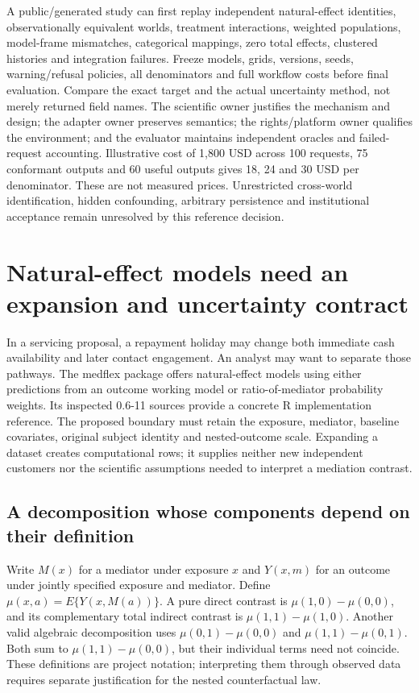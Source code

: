 A public/generated study can first replay independent natural-effect
identities, observationally equivalent worlds, treatment interactions,
weighted populations, model-frame mismatches, categorical mappings, zero total
effects, clustered histories and integration failures. Freeze models, grids,
versions, seeds, warning/refusal policies, all denominators and full workflow
costs before final evaluation. Compare the exact target and the actual
uncertainty method, not merely returned field names. The scientific owner
justifies the mechanism and design; the adapter owner preserves semantics;
the rights/platform owner qualifies the environment; and the evaluator
maintains independent oracles and failed-request accounting. Illustrative
cost of 1,800 USD across 100 requests, 75 conformant outputs and 60 useful
outputs gives 18, 24 and 30 USD per denominator. These are not measured prices.
Unrestricted cross-world identification, hidden confounding, arbitrary
persistence and institutional acceptance remain unresolved by this reference
decision.~\citep{exec24_mediation_contract}


\section{Natural-effect models need an expansion and uncertainty contract}
\label{exec23:medflex-scope}
In a servicing proposal, a repayment holiday may change both immediate cash
availability and later contact engagement. An analyst may want to separate
those pathways. The medflex package offers natural-effect models using either
predictions from an outcome working model or ratio-of-mediator probability
weights. Its inspected 0.6-11 sources provide a concrete R implementation
reference. The proposed boundary must retain the exposure, mediator, baseline
covariates, original subject identity and nested-outcome scale. Expanding a
dataset creates computational rows; it supplies neither new independent
customers nor the scientific assumptions needed to interpret a mediation
contrast.
\citep{exec23_medflex_sources}

\subsection{A decomposition whose components depend on their definition}
\label{exec23:medflex-target}
Write $M(x)$ for a mediator under exposure $x$ and $Y(x,m)$ for an outcome
under jointly specified exposure and mediator. Define
$\mu(x,a)=E\{Y(x,M(a))\}$. A pure direct contrast is
$\mu(1,0)-\mu(0,0)$, and its complementary total indirect contrast is
$\mu(1,1)-\mu(1,0)$. Another valid algebraic decomposition uses
$\mu(0,1)-\mu(0,0)$ and $\mu(1,1)-\mu(0,1)$. Both sum to
$\mu(1,1)-\mu(0,0)$, but their individual terms need not coincide.
These definitions are project notation; interpreting them through observed
data requires separate justification for the nested counterfactual law.

